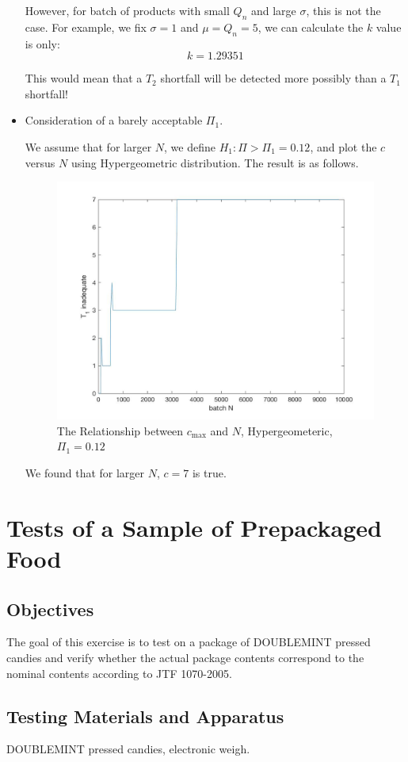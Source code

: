\documentclass[a4paper]{article}
\begin{document}
\begin{itemize}
However, for batch of products with small $Q_n$ and large $\sigma$, this is not the case. For example, we fix $\sigma=1$ and $\mu=Q_n=5$, we can calculate the $k$ value is only:
$$k = 1.29351$$

This would mean that a $T_2$ shortfall will be detected more possibly than a $T_1$ shortfall!

\item Consideration of a barely acceptable $\Pi_1$.

We assume that for larger $N$, we define $H_1: \Pi > \Pi_1 = 0.12$, and plot the $c$ versus $N$ using Hypergeometric distribution. The result is as follows.

\begin{figure}[!htbp] 
\centering 
\includegraphics[width=0.7\linewidth]{beta-hyper-pi1.jpg}  
\caption{The Relationship between $c_{\max}$ and $N$, Hypergeometeric, $\Pi_1=0.12$} 
\end{figure}

We found that for larger $N$, $c=7$ is true.
\end{itemize}


\newpage

\section{Tests of a Sample of Prepackaged Food}
\subsection{Objectives}
The goal of this exercise is to test on a package of DOUBLEMINT pressed candies and verify whether the actual package contents correspond to the nominal contents according to JTF 1070-2005.

\subsection{Testing Materials and Apparatus}
DOUBLEMINT pressed candies, electronic weigh.
\end{document}
